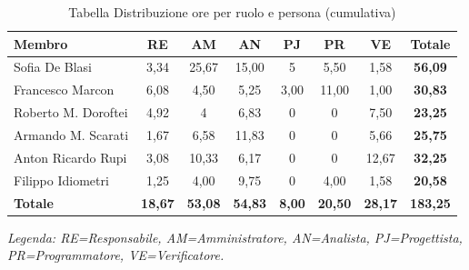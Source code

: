 \begin{table}[H]
    \centering
    \renewcommand{\arraystretch}{1.3}
    \begin{tabularx}{\textwidth}{|X|c|c|c|c|c|c|c|}
        \hline
        \textbf{Membro} & \textbf{RE} & \textbf{AM} & \textbf{AN} &
        \textbf{PJ} & \textbf{PR} & \textbf{VE} & \textbf{Totale} \\
        \hline
        Sofia De Blasi       & 3,34 & 25,67 & 15,00 & 5    & 5,50    & 1,58 & \textbf{56,09} \\
        \hline
        Francesco Marcon     & 6,08 & 4,50  & 5,25  & 3,00 & 11,00 & 1,00 & \textbf{30,83} \\
        \hline
        Roberto M. Doroftei  & 4,92 & 4     & 6,83  & 0    & 0    & 7,50 & \textbf{23,25} \\
        \hline
        Armando M. Scarati   & 1,67 & 6,58  & 11,83 & 0    & 0    & 5,66    & \textbf{25,75} \\
        \hline
        Anton Ricardo Rupi   & 3,08 & 10,33  & 6,17  & 0    & 0    & 12,67 & \textbf{32,25} \\
        \hline
        Filippo Idiometri    & 1,25 & 4,00  & 9,75  & 0    & 4,00    & 1,58 & \textbf{20,58} \\
        \hline
        \textbf{Totale} & \textbf{18,67} & \textbf{53,08} & \textbf{54,83} & \textbf{8,00} & \textbf{20,50} & \textbf{28,17} & \textbf{183,25} \\
        \hline
    \end{tabularx}
    \begin{minipage}{\textwidth}
        \smallskip
        \footnotesize\textit{Legenda: RE=Responsabile, AM=Amministratore,
        AN=Analista, PJ=Progettista, PR=Programmatore, VE=Verificatore.}
    \end{minipage}
    \caption{Tabella Distribuzione ore per ruolo e persona (cumulativa)}
\end{table}